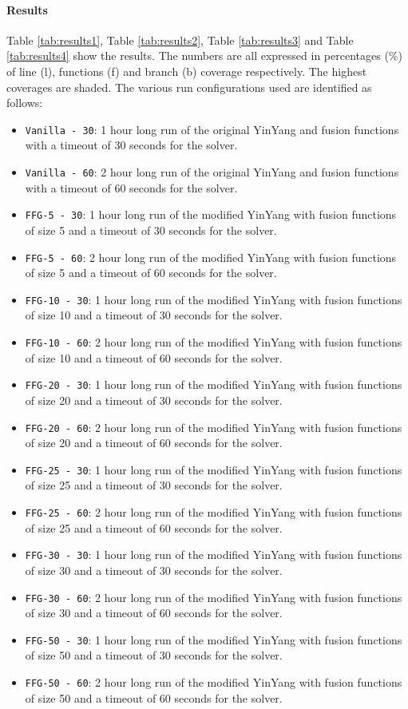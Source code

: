 \documentclass[sigplan,screen]{acmart}
\begin{document}
\paragraph{Results}
Table \ref{tab:results1}, Table \ref{tab:results2}, Table \ref{tab:results3} and Table \ref{tab:results4} show the results. The numbers are all expressed in percentages (\%) of line (l), functions (f) and branch (b) coverage respectively. The highest coverages are shaded. The various run configurations used are identified as follows:
\begin{itemize}
    \item \texttt{Vanilla - 30}: 1 hour long run of the original YinYang and fusion functions with a timeout of 30 seconds for the solver.
    \item \texttt{Vanilla - 60}: 2 hour long run of the original YinYang and fusion functions with a timeout of 60 seconds for the solver.
    \item \texttt{FFG-5 - 30}: 1 hour long run of the modified YinYang with fusion functions of size 5 and a timeout of 30 seconds for the solver.
    \item \texttt{FFG-5 - 60}: 2 hour long run of the modified YinYang with fusion functions of size 5 and a timeout of 60 seconds for the solver.
    \item \texttt{FFG-10 - 30}: 1 hour long run of the modified YinYang with fusion functions of size 10 and a timeout of 30 seconds for the solver.
    \item \texttt{FFG-10 - 60}: 2 hour long run of the modified YinYang with fusion functions of size 10 and a timeout of 60 seconds for the solver.
    \item \texttt{FFG-20 - 30}: 1 hour long run of the modified YinYang with fusion functions of size 20 and a timeout of 30 seconds for the solver.
    \item \texttt{FFG-20 - 60}: 2 hour long run of the modified YinYang with fusion functions of size 20 and a timeout of 60 seconds for the solver.
    \item \texttt{FFG-25 - 30}: 1 hour long run of the modified YinYang with fusion functions of size 25 and a timeout of 30 seconds for the solver.
    \item \texttt{FFG-25 - 60}: 2 hour long run of the modified YinYang with fusion functions of size 25 and a timeout of 60 seconds for the solver.
    \item \texttt{FFG-30 - 30}: 1 hour long run of the modified YinYang with fusion functions of size 30 and a timeout of 30 seconds for the solver.
    \item \texttt{FFG-30 - 60}: 2 hour long run of the modified YinYang with fusion functions of size 30 and a timeout of 60 seconds for the solver.
    
    \item \texttt{FFG-50 - 30}: 1 hour long run of the modified YinYang with fusion functions of size 50 and a timeout of 30 seconds for the solver.
    \item \texttt{FFG-50 - 60}: 2 hour long run of the modified YinYang with fusion functions of size 50 and a timeout of 60 seconds for the solver.
    
\end{itemize}
\end{document}

